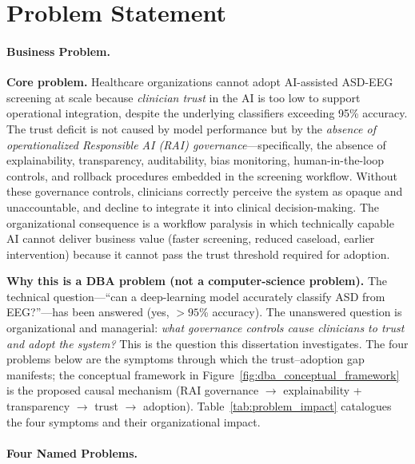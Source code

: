 \section{Problem Statement}
\label{sec:problem_statement}
\paragraph{Business Problem.}


\noindent\textbf{Core problem.} Healthcare organizations cannot adopt AI-assisted ASD-EEG screening at scale because \emph{clinician trust} in the AI is too low to support operational integration, despite the underlying classifiers exceeding 95\% accuracy. The trust deficit is not caused by model performance but by the \emph{absence of operationalized Responsible AI (RAI) governance}---specifically, the absence of explainability, transparency, auditability, bias monitoring, human-in-the-loop controls, and rollback procedures embedded in the screening workflow. Without these governance controls, clinicians correctly perceive the system as opaque and unaccountable, and decline to integrate it into clinical decision-making. The organizational consequence is a workflow paralysis in which technically capable AI cannot deliver business value (faster screening, reduced caseload, earlier intervention) because it cannot pass the trust threshold required for adoption.

\noindent\textbf{Why this is a DBA problem (not a computer-science problem).} The technical question---``can a deep-learning model accurately classify ASD from EEG?''---has been answered (yes, $>95$\% accuracy). The unanswered question is organizational and managerial: \emph{what governance controls cause clinicians to trust and adopt the system?} This is the question this dissertation investigates. The four problems below are the symptoms through which the trust--adoption gap manifests; the conceptual framework in Figure~\ref{fig:dba_conceptual_framework} is the proposed causal mechanism (RAI governance $\to$ explainability + transparency $\to$ trust $\to$ adoption). Table~\ref{tab:problem_impact} catalogues the four symptoms and their organizational impact.

\paragraph{Four Named Problems.}




